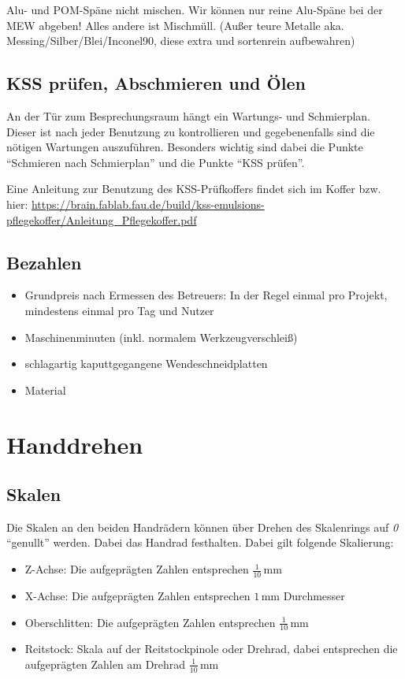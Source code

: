 \documentclass{\basedir/fablab-document}
\begin{document}
Alu- und POM-Späne nicht mischen. Wir können nur reine Alu-Späne bei der MEW abgeben! Alles andere ist Mischmüll. (Außer teure Metalle aka. Messing/Silber/Blei/Inconel90, diese extra und sortenrein aufbewahren)

\subsection{KSS prüfen, Abschmieren und Ölen}
An der Tür zum Besprechungsraum hängt ein Wartungs- und Schmierplan. Dieser ist nach jeder Benutzung zu kontrollieren und gegebenenfalls sind die nötigen Wartungen auszuführen. Besonders wichtig sind dabei die Punkte \enquote{Schmieren nach Schmierplan} und die Punkte \enquote{KSS prüfen}.

Eine Anleitung zur Benutzung des KSS-Prüfkoffers findet sich im Koffer bzw. hier: \url{https://brain.fablab.fau.de/build/kss-emulsions-pflegekoffer/Anleitung_Pflegekoffer.pdf}


\subsection{Bezahlen}
\begin{itemize}
 \item Grundpreis nach Ermessen des Betreuers: In der Regel einmal pro Projekt, mindestens einmal pro Tag und Nutzer
 \item Maschinenminuten (inkl. normalem Werkzeugverschleiß)
 \item schlagartig kaputtgegangene Wendeschneidplatten
 \item Material
\end{itemize}




\newpage
\section{Handdrehen}
\label{handdrehen}
\subsection{Skalen}

Die Skalen an den beiden Handrädern können über Drehen des Skalenrings auf \emph{0} \enquote{genullt} werden.
Dabei das Handrad festhalten.
Dabei gilt folgende Skalierung:
\begin{itemize}
\item Z-Achse: Die aufgeprägten Zahlen entsprechen $\frac{1}{10}$\,mm 
\item X-Achse: Die aufgeprägten Zahlen entsprechen $1$\,mm Durchmesser
\item Oberschlitten: Die aufgeprägten Zahlen entsprechen $\frac{1}{10}$\,mm 
\item Reitstock: Skala auf der Reitstockpinole oder Drehrad, dabei entsprechen die aufgeprägten Zahlen am Drehrad $\frac{1}{10}$\,mm
\end{itemize}
\end{document}
